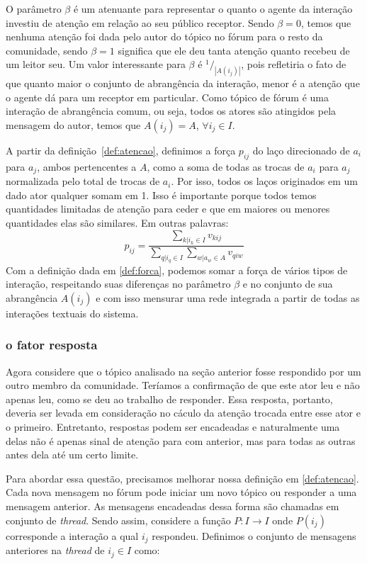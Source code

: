 \documentclass{article}
\begin{document}
O parâmetro $\beta$ é um atenuante para representar o quanto o agente da
interação investiu de atenção em relação ao seu público receptor. Sendo
$\beta=0$, temos que nenhuma atenção foi dada pelo autor do tópico no fórum
para o resto da comunidade, sendo $\beta=1$ significa que ele deu tanta atenção
quanto recebeu de um leitor seu. Um valor interessante para $\beta$ é
$^1/_{|A(i_j)|}$, pois refletiria o fato de que quanto maior o conjunto de
abrangência da interação, menor é a atenção que o agente dá para um receptor em
particular. Como tópico de fórum é uma interação de abrangência comum, ou seja,
todos os atores são atingidos pela mensagem do autor, temos que $A(i_j)=A$,
$\forall i_j \in I$.

A partir da definição~\ref{def:atencao}, definimos a força $p_{ij}$ do laço
direcionado de $a_i$ para $a_j$, ambos pertencentes a $A$, como a soma de todas
as trocas de $a_i$ para $a_j$ normalizada pelo total de trocas de $a_i$.
Por isso, todos os laços originados em um dado ator qualquer somam em 1. Isso
é importante porque todos temos quantidades limitadas de atenção para ceder e
que em maiores ou menores quantidades elas são similares. Em outras palavras:
\begin{equation}
\label{def:forca}
p_{ij}=\frac{\sum_{k|i_k \in I}v_{kij}}{\sum_{q|i_q \in I}\sum_{w|a_w
\in A}v_{qiw}}
\end{equation}
Com a definição dada em \ref{def:forca}, podemos somar a força de vários
tipos de interação, respeitando suas diferenças no parâmetro $\beta$ e
no conjunto de sua abrangência $A(i_j)$ e com isso mensurar uma rede integrada
a partir de todas as interações textuais do sistema. 
\subsubsection{o fator resposta}
Agora considere que o tópico analisado na seção anterior fosse respondido por um
outro membro da comunidade. Teríamos a confirmação de que este ator leu e não
apenas leu, como se deu ao trabalho de responder. Essa resposta, portanto,
deveria ser levada em consideração no cáculo da atenção trocada entre esse ator
e o primeiro. Entretanto, respostas podem ser encadeadas e naturalmente uma
delas não é apenas sinal de atenção para com anterior, mas para todas as outras
antes dela até um certo limite.

Para abordar essa questão, precisamos melhorar nossa definição em
\ref{def:atencao}. Cada nova mensagem no fórum pode iniciar um novo tópico ou
responder a uma mensagem anterior. As mensagens encadeadas dessa forma são
chamadas em conjunto de \textit{thread}. Sendo assim, considere a função
$P:I\to I$ onde $P(i_j)$ corresponde a interação a qual $i_j$ respondeu.
Definimos o conjunto de mensagens anteriores na \textit{thread} de $i_j \in I$
como:
\end{document}
